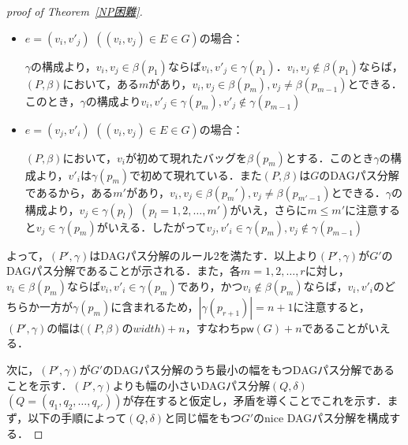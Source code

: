 \documentclass[master]{kuisthesis}		%
\theoremstyle{plain}
\theoremstyle{definition}
\begin{document}
{\begin{proof}[proof of Theorem~\ref{NP困難}]
\begin{itemize}
        $\gamma$の構成より，$v_i \in \beta(p_1)$ならば$v_i, v'_i \in \gamma(p_1)$．$v_i \notin \beta(p_1)$ならば，$(P, \beta)$で$v$が初めて現れたバッグを$\beta(p_m)$とすると，$v_i, v'_i \in \gamma(p_m)$であり，$v'_i$は$\gamma(p_1)$で初めて現れている．よって$v_i, v'_i \in \gamma(p_m), v'_i \notin \gamma(p_{m-1})$
        \item $e = (v_i, v'_j)$ $((v_i, v_j) \in E \in G)$の場合：
        
        $\gamma$の構成より，$v_i, v_j \in \beta(p_1)$ならば$v_i, v'_j \in \gamma(p_1)$．$v_i, v_j \notin \beta(p_1)$ならば，$(P, \beta)$において，ある$m$があり，$v_i, v_j \in \beta(p_m), v_j \neq \beta(p_{m-1})$とできる．このとき，$\gamma$の構成より$v_i, v'_j \in \gamma(p_m), v'_j \notin \gamma(p_{m-1})$
        \item $e = (v_j, v'_i)$ $((v_i, v_j) \in E \in G)$の場合：
        
        $(P, \beta)$において，$v_i$が初めて現れたバッグを$\beta(p_m)$とする．このとき$\gamma$の構成より，$v'_i$は$\gamma(p_m)$で初めて現れている．また$(P, \beta)$は$G$のDAGパス分解であるから，ある$m'$があり，$v_i, v_j \in \beta(p_m'), v_j \neq \beta(p_{m'-1})$とできる．$\gamma$の構成より，$v_j \in \gamma(p_l)$ $(p_l = 1, 2, \dots, m')$がいえ，さらに$m \leq m'$に注意すると$v_j \in \gamma(p_m)$がいえる．したがって$v_j, v'_i \in \gamma(p_m), v_j \notin \gamma(p_{m-1})$
    \end{itemize}

    よって，$(P', \gamma)$はDAGパス分解のルール2を満たす．以上より$(P', \gamma)$が$G'$のDAGパス分解であることが示される．また，各$m = 1, 2, \dots, r$に対し，$v_i \in \beta(p_m)$ならば$v_i, v'_i \in \gamma(p_m)$であり，かつ$v_i \notin \beta(p_m)$ならば，$v_i, v'_i$のどちらか一方が$\gamma(p_m)$に含まれるため，$|\gamma(p_{r+1})| = n + 1$に注意すると，$(P', \gamma)$の幅は$((P, \beta)$の$width)+ n$，すなわち$\mathsf{pw}(G) + n$であることがいえる．

    

    次に，$(P', \gamma)$が$G'$のDAGパス分解のうち最小の幅をもつDAGパス分解であることを示す．$(P', \gamma)$よりも幅の小さいDAGパス分解$(Q, \delta)$ $(Q = (q_1, q_2, \dots, q_{r'}))$が存在すると仮定し，矛盾を導くことでこれを示す．まず，以下の手順によって$(Q, \delta)$と同じ幅をもつ$G'$のnice DAGパス分解を構成する．


\end{proof}}
\end{document}
